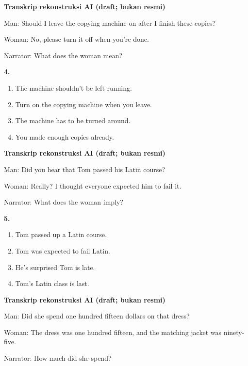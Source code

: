 \documentclass[12pt]{article}
\begin{document}
\par
\vspace{0.25\baselineskip}
\begin{exampleblock}
\textbf{Transkrip rekonstruksi AI (draft; bukan resmi)}\par
Man: Should I leave the copying machine on after I finish these copies?\par
Woman: No, please turn it off when you're done.\par
Narrator: What does the woman mean?\par
\end{exampleblock}
\noindent\textbf{4.}
\begin{enumerate}[label=(\Alph*),leftmargin=*,itemsep=0.2em]
\item The machine shouldn't be left running.
\item Turn on the copying machine when you leave.
\item The machine has to be turned around.
\item You made enough copies already.
\end{enumerate}
\par
\vspace{0.25\baselineskip}
\begin{exampleblock}
\textbf{Transkrip rekonstruksi AI (draft; bukan resmi)}\par
Man: Did you hear that Tom passed his Latin course?\par
Woman: Really? I thought everyone expected him to fail it.\par
Narrator: What does the woman imply?\par
\end{exampleblock}
\noindent\textbf{5.}
\begin{enumerate}[label=(\Alph*),leftmargin=*,itemsep=0.2em]
\item Tom passed up a Latin course.
\item Tom was expected to fail Latin.
\item He's surprised Tom is late.
\item Tom's Latin class is last.
\end{enumerate}
\par
\vspace{0.25\baselineskip}
\begin{exampleblock}
\textbf{Transkrip rekonstruksi AI (draft; bukan resmi)}\par
Man: Did she spend one hundred fifteen dollars on that dress?\par
Woman: The dress was one hundred fifteen, and the matching jacket was ninety-five.\par
Narrator: How much did she spend?\par
\end{exampleblock}
\end{document}

